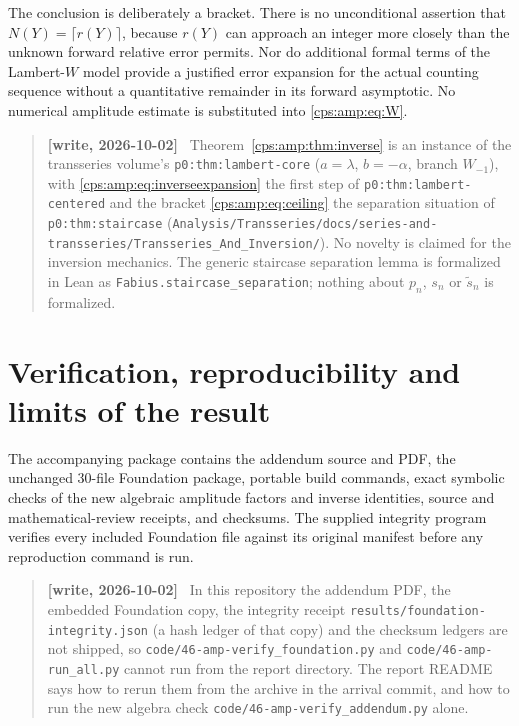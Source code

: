 \documentclass[11pt,letterpaper]{article}
\numberwithin{equation}{section}
\theoremstyle{remark}\newtheorem{remark}[theorem]{Remark}
\newcommand{\repo}[1]{\nolinkurl{#1}}
\newenvironment{writenote}{\begin{quote}\small\sloppy\textbf{[write, 2026-10-02]}\ }{\end{quote}}
\begin{document}
The conclusion is deliberately a bracket. There is no unconditional assertion that $N(Y)=\lceil r(Y)\rceil$, because $r(Y)$ can approach an integer more closely than the unknown forward relative error permits. Nor do additional formal terms of the Lambert-$W$ model provide a justified error expansion for the actual counting sequence without a quantitative remainder in its forward asymptotic. No numerical amplitude estimate is substituted into \eqref{cps:amp:eq:W}.

\begin{writenote}
Theorem~\ref{cps:amp:thm:inverse} is an instance of the transseries volume's
\texttt{p0:thm:lambert-core} ($a=\lambda$, $b=-\alpha$, branch $W_{-1}$), with
\eqref{cps:amp:eq:inverseexpansion} the first step of \texttt{p0:thm:lambert-centered} and the
bracket \eqref{cps:amp:eq:ceiling} the separation situation of \texttt{p0:thm:staircase}
(\repo{Analysis/Transseries/docs/series-and-transseries/Transseries_And_Inversion/}). No
novelty is claimed for the inversion mechanics. The generic staircase separation lemma is
formalized in Lean as \texttt{Fabius.staircase\_separation}; nothing about $p_n$, $s_n$ or
$\widetilde s_n$ is formalized.
\end{writenote}

\section{Verification, reproducibility and limits of the result}
The accompanying package contains the addendum source and PDF, the unchanged 30-file Foundation package, portable build commands, exact symbolic checks of the new algebraic amplitude factors and inverse identities, source and mathematical-review receipts, and checksums. The supplied integrity program verifies every included Foundation file against its original manifest before any reproduction command is run.

\begin{writenote}
In this repository the addendum PDF, the embedded Foundation copy, the integrity
receipt \texttt{results/foundation-integrity.json} (a hash ledger of that copy) and the checksum
ledgers are not shipped, so \texttt{code/46-amp-verify\_foundation.py} and
\texttt{code/46-amp-run\_all.py} cannot run from the report directory. The report README says how
to rerun them from the archive in the arrival commit, and how to run the new algebra check
\texttt{code/46-amp-verify\_addendum.py} alone.
\end{writenote}
\end{document}

